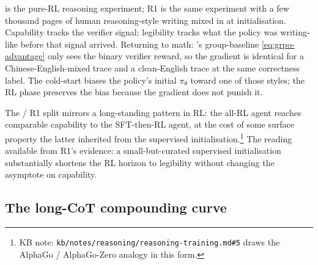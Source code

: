 \begin{intuition}
 is the pure-RL reasoning experiment; R1 is the same
experiment with a few thousand pages of human reasoning-style writing
mixed in at initialisation. Capability tracks the verifier signal;
legibility tracks what the policy was writing-like before that
signal arrived. Returning to math: 's group-baseline
\cref{eq:grpo-advantage} only sees the binary verifier reward, so the
gradient is identical for a Chinese-English-mixed trace and a
clean-English trace at the same correctness label. The cold-start
biases the policy's initial $\pi_\theta$ toward one of those styles;
the RL phase preserves the bias because the gradient does not punish
it.
\end{intuition}

The  / R1 split mirrors a long-standing pattern in RL: the
all-RL agent reaches comparable capability to the SFT-then-RL agent,
at the cost of some surface property the latter inherited from the
supervised initialisation.\footnote{KB note:
\texttt{kb/notes/reasoning/reasoning-training.md\#5} draws the
AlphaGo / AlphaGo-Zero analogy in this form.} The reading available
from R1's evidence: a small-but-curated supervised initialisation
substantially shortens the RL horizon to legibility without changing
the asymptote on capability.

\subsection{The long-CoT compounding curve}
\label{sec:r1-compounding}

